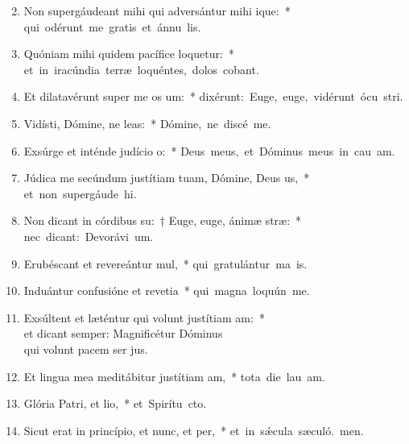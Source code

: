 \begin{flushleft}
\begin{enumerate}[leftmargin=*]
\setcounter{enumi}{1}

\item Non supergáudeant mihi qui adversántur mihi ique:~* \mbox{qui odérunt me gratis et ánnu lis.}
\item Quóniam mihi quidem pacífice loquetur:~* \mbox{et in iracúndia terræ loquéntes, dolos cobant.}
\item Et dilatavérunt super me os um:~* \mbox{dixérunt: Euge, euge, vidérunt ócu stri.}
\item Vidísti, Dómine, ne leas:~* \mbox{Dómine, ne discé  me.}
\item Exsúrge et inténde judício o:~* \mbox{Deus meus, et Dóminus meus in cau am.}
\item Júdica me secúndum justítiam tuam, Dómine, Deus us,~* \mbox{et non supergáude hi.}
\item Non dicant in córdibus su:~† Euge, euge, ánimæ stræ:~* \mbox{nec dicant: Devorávi um.}
\item Erubéscant et revereántur mul,~* \mbox{qui gratulántur ma is.}
\item Induántur confusióne et revetia~* \mbox{qui magna loquún  me.}
\item Exsúltent et læténtur qui volunt justítiam am:~* \\et dicant semper: Magnificétur Dóminus \\qui volunt pacem ser jus.
\item Et lingua mea meditábitur justítiam am,~* \mbox{tota die lau am.}
\item Glória Patri, et lio,~* \mbox{et Spirítu cto.}
\item Sicut erat in princípio, et nunc, et per,~* \mbox{et in s\'{\ae}cula sæculó. men.}

\end{enumerate}
\end{flushleft}


